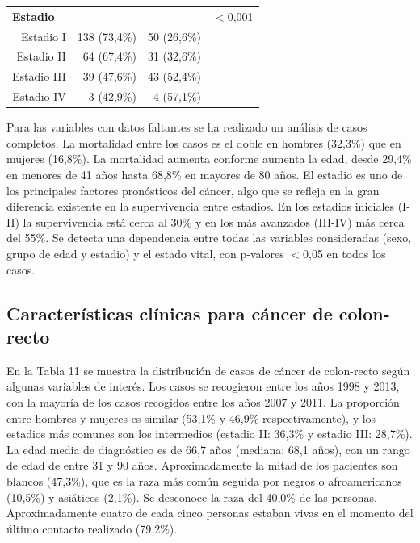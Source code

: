 \begin{table}[H]
\begin{tabular}{rrrc}
		\multicolumn{1}{l}{\textbf{Estadio}}           &                           &                             & $<$0,001                         \\
		Estadio I                                      & 138 (73,4\%)              & 50 (26,6\%)                 &                                          \\
		Estadio II                                     & 64 (67,4\%)               & 31 (32,6\%)                 &                                          \\
		Estadio III                                    & 39 (47,6\%)               & 43 (52,4\%)                 &                                          \\
		Estadio IV                                     & 3 (42,9\%)                & 4 (57,1\%)                  &                                          \\ \hline
	\end{tabular}
\end{table}

Para las variables con datos faltantes se ha realizado un análisis de casos completos.  La mortalidad entre los casos es el doble en hombres (32,3\%) que en mujeres (16,8\%). La mortalidad aumenta conforme aumenta la edad, desde 29,4\% en menores de 41 años hasta 68,8\% en mayores de 80 años. El estadio es uno de los principales factores pronósticos del cáncer, algo que se refleja en la gran diferencia existente en la supervivencia entre estadios. En los estadios iniciales (I-II) la supervivencia está cerca al 30\% y en los más avanzados (III-IV) más cerca del 55\%. Se detecta una dependencia entre todas las variables consideradas (sexo, grupo de edad y estadio)  y el estado vital, con p-valores $<$0,05 en todos los casos.

\subsection{Características clínicas para cáncer de colon-recto}

En la Tabla 11 se muestra  la distribución de casos de cáncer de colon-recto según algunas variables de interés. Los casos se recogieron entre los años 1998 y 2013, con la mayoría de los casos recogidos entre los años 2007 y 2011. La proporción entre hombres y mujeres es similar (53,1\% y 46,9\% respectivamente), y los estadios más comunes son los intermedios (estadio II: 36,3\% y estadio III: 28,7\%). La edad media de diagnóstico es de 66,7 años (mediana: 68,1 años), con un rango de edad de entre 31 y 90 años. Aproximadamente la mitad de los pacientes son blancos (47,3\%), que es la raza más común seguida por negros o afroamericanos (10,5\%) y asiáticos (2,1\%). Se desconoce la raza del 40,0\% de las personas. Aproximadamente cuatro de cada cinco personas estaban vivas en el momento del último contacto realizado (79,2\%).\\

